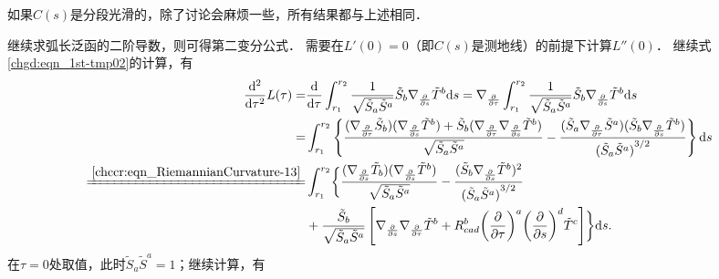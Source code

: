 如果$C(s)$是分段光滑的，除了讨论会麻烦一些，所有结果都与上述相同．


继续求弧长泛函的二阶导数，则可得第二变分公式． %
需要在$L'(0)=0$（即$C(s)$是测地线）的前提下计算$L''(0)$． %
继续式\eqref{chgd:eqn_1st-tmp02}的计算，有
\setlength{\mathindent}{0em}
\begin{align*}
    \frac{{\rm d}^2}{{\rm d} \tau^2 }L(\tau)=&   \frac{{\rm d}}{{\rm d} \tau }
    \int_{r_1}^{r_2} \frac{1}{\sqrt{ \tilde{S}_a \tilde{S}^a } }
    \tilde{S}_b \nabla_{\frac{\partial}{\partial s}} \tilde{T}^b {\rm d}s
    =  \nabla_{\frac{\partial}{\partial \tau}}
    \int_{r_1}^{r_2} \frac{1}{\sqrt{ \tilde{S}_a \tilde{S}^a } }
    \tilde{S}_b \nabla_{\frac{\partial}{\partial s}} \tilde{T}^b {\rm d}s  \\
    =& \int_{r_1}^{r_2} \left\{\frac{(\nabla_{\frac{\partial}{\partial \tau}} \tilde{S}_b)
        (\nabla_{\frac{\partial}{\partial s}} \tilde{T}^b)
    +\tilde{S}_b (\nabla_{\frac{\partial}{\partial \tau}} \nabla_{\frac{\partial}{\partial s}} \tilde{T}^b) }
    {\sqrt{ \tilde{S}_a \tilde{S}^a } } - \frac{ (\tilde{S}_a \nabla_{\frac{\partial}{\partial \tau}} \tilde{S}^a)
     (\tilde{S}_b\nabla_{\frac{\partial}{\partial s}} \tilde{T}^b)} {{( \tilde{S}_a \tilde{S}^a) }^{3/2}}  \right\}{\rm d}s \\
    \xlongequal{\ref{chccr:eqn_RiemannianCurvature-13}} &
    \int_{r_1}^{r_2} \biggl\{
    \frac{(\nabla_{\frac{\partial}{\partial s}} \tilde{T}_b) 
    (\nabla_{\frac{\partial}{\partial s}} \tilde{T}^b)}{\sqrt{ \tilde{S}_a \tilde{S}^a } }
    -\frac{(\tilde{S}_b \nabla_{\frac{\partial}{\partial s}} \tilde{T}^b)^2 }
    {{( \tilde{S}_a \tilde{S}^a) }^{3/2}} \\
    &+ \frac{\tilde{S}_b}{\sqrt{ \tilde{S}_a \tilde{S}^a } }\left[
     \nabla_{\frac{\partial}{\partial s}} \nabla_{\frac{\partial}{\partial \tau}} \tilde{T}^b
    + R_{cad}^b{\left(\frac{\partial}{\partial \tau}\right)^a}
    {\left(\frac{\partial}{\partial s}\right)^d}{\tilde{T}^c}\right] \biggr\} {\rm d}s . 
\end{align*}\setlength{\mathindent}{2em}
在$\tau=0$处取值，此时$\tilde{S}_a \tilde{S}^a =1$；继续计算，有
\setlength{\mathindent}{0em}
